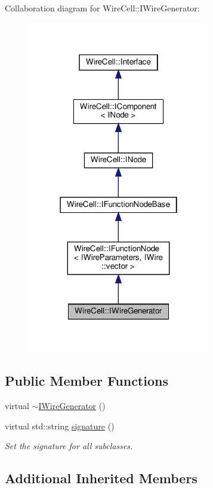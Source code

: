 Collaboration diagram for Wire\+Cell\+:\+:I\+Wire\+Generator\+:
\nopagebreak
\begin{figure}[H]
\begin{center}
\leavevmode
\includegraphics[width=226pt]{class_wire_cell_1_1_i_wire_generator__coll__graph}
\end{center}
\end{figure}
\subsection*{Public Member Functions}
\begin{DoxyCompactItemize}
\item 
virtual \hyperlink{class_wire_cell_1_1_i_wire_generator_affa4ee1e567d1a83a471150885d8d26b}{$\sim$\+I\+Wire\+Generator} ()
\item 
virtual std\+::string \hyperlink{class_wire_cell_1_1_i_wire_generator_adfafb9936be3d0d4165ca580d48513c6}{signature} ()
\begin{DoxyCompactList}\small\item\em Set the signature for all subclasses. \end{DoxyCompactList}\end{DoxyCompactItemize}
\subsection*{Additional Inherited Members}


